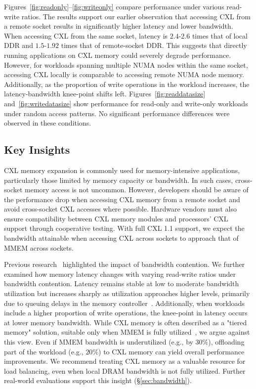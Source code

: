 Figures~\ref{fig:readonly}--\ref{fig:writeonly} compare performance under various read-write ratios. The results support our earlier observation that accessing CXL from a remote socket results in significantly higher latency and lower bandwidth. When accessing CXL from the same socket, latency is $2.4$-$2.6$ times that of local DDR and $1.5$-$1.92$ times that of remote-socket DDR. This suggests that directly running applications on CXL memory could severely degrade performance. However, for workloads spanning multiple NUMA nodes within the same socket, accessing CXL locally is comparable to accessing remote NUMA node memory. Additionally, as the proportion of write operations in the workload increases, the latency-bandwidth knee-point shifts left. Figures~\ref{fig:readdatasize} and~\ref{fig:writedatasize} show performance for read-only and write-only workloads under random access patterns. No significant performance differences were observed in these conditions.

\subsection{Key Insights}
CXL memory expansion is commonly used for memory-intensive applications, particularly those limited by memory capacity or bandwidth. In such cases, cross-socket memory access is not uncommon. However, developers should be aware of the performance drop when accessing CXL memory from a remote socket and avoid cross-socket CXL accesses where possible. Hardware vendors must also ensure compatibility between CXL memory modules and processors’ CXL support through cooperative testing. With full CXL 1.1 support, we expect the bandwidth attainable when accessing CXL across sockets to approach that of MMEM across sockets.

Previous research~\cite{mt2, cxlcentric} highlighted the impact of bandwidth contention. We further examined how memory latency changes with varying read-write ratios under bandwidth contention. Latency remains stable at low to moderate bandwidth utilization but increases sharply as utilization approaches higher levels, primarily due to queuing delays in the memory controller~\cite{cxl-centric}. Additionally, when workloads include a higher proportion of write operations, the knee-point in latency occurs at lower memory bandwidth. While CXL memory is often described as a "tiered memory" solution, suitable only when MMEM is fully utilized~\cite{demystify, tpppatch, Interleavepatch}, we argue against this view. Even if MMEM bandwidth is underutilized (e.g., by $30\%$), offloading part of the workload (e.g., $20\%$) to CXL memory can yield overall performance improvements. We recommend treating CXL memory as a valuable resource for load balancing, even when local DRAM bandwidth is not fully utilized. Further real-world evaluations support this insight (\S\ref{sec:bandwidth}).

